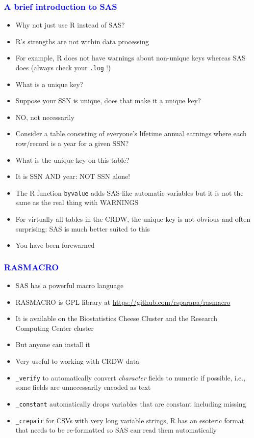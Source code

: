 \documentclass[11pt,pdftex,dvipsnames,usenames]{beamer}
\begin{document}
\begin{frame}[fragile]\frametitle{\bf\textcolor{blue}{A brief
introduction to SAS}}

\begin{itemize}
\item Why not just use R instead of SAS?
\item R's strengths are not within data processing
\item For example, R does not have warnings about non-unique keys
whereas SAS does (always check your \texttt{.log} !)
\item What is a unique key?
\item Suppose your SSN is unique, does that make it a unique key?
\item NO, not necessarily
\item Consider a table consisting of everyone's lifetime annual
  earnings where each row/record is a year for a given SSN?
\item What is the unique key on this table?
\item It is SSN AND year: NOT SSN alone!
\item The R function \texttt{byvalue} adds SAS-like
automatic variables but it is not the same as the real
thing with WARNINGS
\item For virtually all tables in the CRDW, the unique key
is not obvious and often surprising: SAS is much better suited to this
\item You have been forewarned
\end{itemize}

\end{frame}


\begin{frame}[fragile]\frametitle{\bf\textcolor{blue}{RASMACRO}}
\begin{itemize}
\item SAS has a powerful macro language
\item RASMACRO is GPL library at 
\href{https://github.com/rsparapa/rasmacro}{https://github.com/rsparapa/rasmacro}
\item It is available on the Biostatistics Cheese Cluster
and the Research Computing Center cluster
\item But anyone can install it
\item Very useful to working with CRDW data 
\item \texttt{\_verify} to automatically convert {\it character} fields to numeric if possible,
i.e., some fields are unnecessarily encoded as text
\item \texttt{\_constant} automatically drops variables that are constant including missing
\item \texttt{\_crepair} for CSVs with very long variable strings, R has an esoteric format
that needs to be re-formatted so SAS can read them automatically
\end{itemize}
\end{frame}
\end{document}
